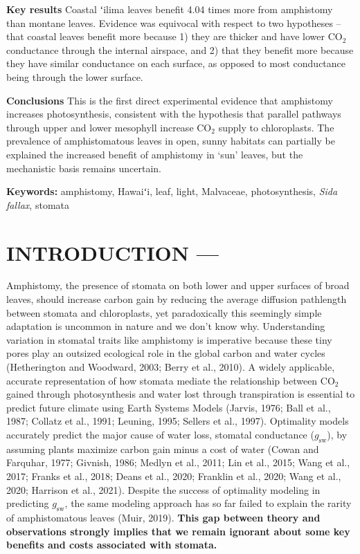 \documentclass[
  letterpaper,
  DIV=11,
  numbers=noendperiod]{scrartcl}
\begin{document}
\textbf{Key results} Coastal ʻilima leaves benefit 4.04 times more from
amphistomy than montane leaves. Evidence was equivocal with respect to
two hypotheses -- that coastal leaves benefit more because 1) they are
thicker and have lower CO\(_2\) conductance through the internal
airspace, and 2) that they benefit more because they have similar
conductance on each surface, as opposed to most conductance being
through the lower surface.

\textbf{Conclusions} This is the first direct experimental evidence that
amphistomy increases photosynthesis, consistent with the hypothesis that
parallel pathways through upper and lower mesophyll increase CO\(_2\)
supply to chloroplasts. The prevalence of amphistomatous leaves in open,
sunny habitats can partially be explained the increased benefit of
amphistomy in `sun' leaves, but the mechanistic basis remains uncertain.

\textbf{Keywords:} amphistomy, Hawaiʻi, leaf, light, Malvaceae,
photosynthesis, \emph{Sida fallax}, stomata

\hypertarget{introduction}{%
\section{INTRODUCTION ---}\label{introduction}}

Amphistomy, the presence of stomata on both lower and upper surfaces of
broad leaves, should increase carbon gain by reducing the average
diffusion pathlength between stomata and chloroplasts, yet paradoxically
this seemingly simple adaptation is uncommon in nature and we don't know
why. Understanding variation in stomatal traits like amphistomy is
imperative because these tiny pores play an outsized ecological role in
the global carbon and water cycles (Hetherington and Woodward, 2003;
Berry et al., 2010). A widely applicable, accurate representation of how
stomata mediate the relationship between CO\(_2\) gained through
photosynthesis and water lost through transpiration is essential to
predict future climate using Earth Systems Models (Jarvis, 1976; Ball et
al., 1987; Collatz et al., 1991; Leuning, 1995; Sellers et al., 1997).
Optimality models accurately predict the major cause of water loss,
stomatal conductance (\(g_\mathrm{sw}\)), by assuming plants maximize
carbon gain minus a cost of water (Cowan and Farquhar, 1977; Givnish,
1986; Medlyn et al., 2011; Lin et al., 2015; Wang et al., 2017; Franks
et al., 2018; Deans et al., 2020; Franklin et al., 2020; Wang et al.,
2020; Harrison et al., 2021). Despite the success of optimality modeling
in predicting \(g_\mathrm{sw}\), the same modeling approach has so far
failed to explain the rarity of amphistomatous leaves (Muir, 2019).
\textbf{This gap between theory and observations strongly implies that
we remain ignorant about some key benefits and costs associated with
stomata.}
\end{document}
